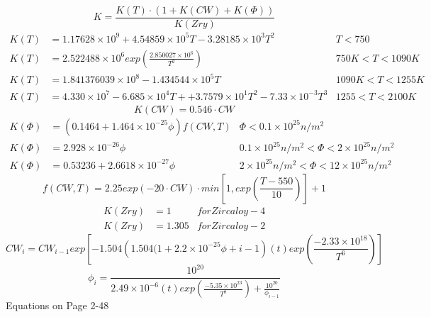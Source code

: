 \documentclass[12pt]{article}
\begin{document}
\begin{equation}
K= \frac{K(T)\cdot (1+K(CW)+K(\Phi))}{K(Zry)}
\end{equation}
\begin{align}
K(T)&=1.17628 \times 10^{9}+4.54859 \times 10^{5}T-3.28185 \times 10^{3}T^{2} & T<750\\
K(T)&=2.522488 \times 10^{6}exp \left( \frac{2.850027 \times 10^6}{T^2} \right) & 750K<T<1090K\\
K(T)&=1.841376039 \times 10^8-1.434544 \times 10^{5}T & 1090K<T<1255K\\
K(T)&=4.330 \times 10^7-6.685 \times 10^{4}T++3.7579 \times 10^{1}T^2 - 7.33 \times 10^{-3}T^3  & 1255<T<2100K
\end{align}
\begin{equation}
K(CW) = 0.546 \cdot CW
\end{equation}
\begin{align}
K(\Phi )&=(0.1464+1.464 \times 10^{-25} \phi)f(CW,T) & \Phi<0.1 \times 10^{25} n/m^2\\
K(\Phi )&=2.928 \times 10^{-26} \phi & 0.1 \times 10^{25} n/m^2< \Phi<2 \times 10^{25} n/m^2\\
K(\Phi )&=0.53236+2.6618 \times 10^{-27} \phi & 2 \times 10^{25} n/m^2< \Phi<12 \times 10^{25} n/m^2
\end{align}
\begin{equation}
f(CW,T)=2.25exp(-20 \cdot CW) \cdot min \left[ 1, exp \left( \frac{T-550}{10} \right) \right] +1
\end{equation}
\begin{align}
K(Zry)&=1 & for Zircaloy-4 \\
K(Zry)&=1.305 & for Zircaloy-2
\end{align}
\begin{equation}
CW_i=CW_{i-1}exp \left[-1.504 \left(1.504(1+2.2 \times 10^{-25} \phi+{i-1} \right) (t) exp \left( \frac{-2.33 \times 10^{18}}{T^6} \right) \right]
\end{equation}
\begin{equation}
\phi_i= \frac{10^{20}}{2.49 \times 10^{-6}(t) exp \left( \frac{-5.35 \times 10^{23}}{T^8} \right)+\frac{10^{20}}{\phi_{i-1}}}
\end{equation}
Equations on Page 2-48
\end{document}
